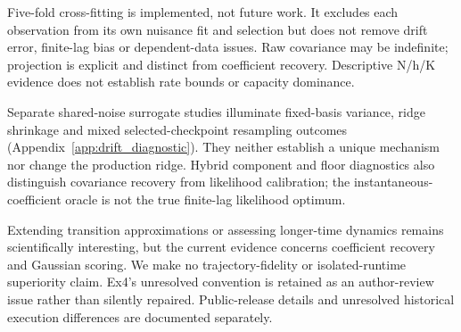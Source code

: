 \documentclass{article}
\begin{document}
Five-fold cross-fitting is implemented, not future work. It excludes each observation from its own nuisance fit and selection but does not remove drift error, finite-lag bias or dependent-data issues. Raw covariance may be indefinite; projection is explicit and distinct from coefficient recovery. Descriptive N/h/K evidence does not establish rate bounds or capacity dominance.

Separate shared-noise surrogate studies illuminate fixed-basis variance, ridge shrinkage and mixed selected-checkpoint resampling outcomes (Appendix~\ref{app:drift_diagnostic}). They neither establish a unique mechanism nor change the production ridge. Hybrid component and floor diagnostics also distinguish covariance recovery from likelihood calibration; the instantaneous-coefficient oracle is not the true finite-lag likelihood optimum.

Extending transition approximations or assessing longer-time dynamics remains scientifically interesting, but the current evidence concerns coefficient recovery and Gaussian scoring. We make no trajectory-fidelity or isolated-runtime superiority claim. Ex4's unresolved convention is retained as an author-review issue rather than silently repaired. Public-release details and unresolved historical execution differences are documented separately.




\appendix



\end{document}
